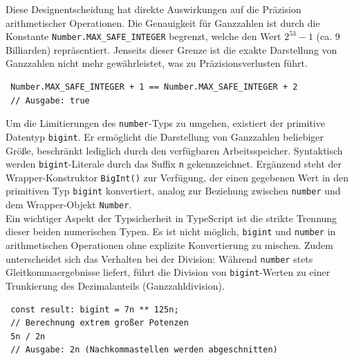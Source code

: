 Diese Designentscheidung hat direkte Auswirkungen auf die Präzision arithmetischer Operationen. Die Genauigkeit für Ganzzahlen ist durch die Konstante \texttt{Number.MAX\_SAFE\_INTEGER} begrenzt, welche den Wert $2^{53} - 1$ (ca. 9 Billiarden) repräsentiert. Jenseits dieser Grenze ist die exakte Darstellung von Ganzzahlen nicht mehr gewährleistet, was zu Präzisionsverlusten führt.
\begin{verbatim}
 Number.MAX_SAFE_INTEGER + 1 == Number.MAX_SAFE_INTEGER + 2
 // Ausgabe: true
\end{verbatim}

Um die Limitierungen des \texttt{number}-Typs zu umgehen, existiert der primitive Datentyp \texttt{bigint}. Er ermöglicht die Darstellung von Ganzzahlen beliebiger Größe, beschränkt lediglich durch den verfügbaren Arbeitsspeicher. Syntaktisch werden \texttt{bigint}-Literale durch das Suffix \texttt{n} gekennzeichnet. Ergänzend steht der Wrapper-Konstruktor \texttt{BigInt()} zur Verfügung, der einen gegebenen Wert in den primitiven Typ \texttt{bigint} konvertiert, analog zur Beziehung zwischen \texttt{number} und dem Wrapper-Objekt \texttt{Number}.\\
Ein wichtiger Aspekt der Typsicherheit in TypeScript ist die strikte Trennung dieser beiden numerischen Typen. Es ist nicht möglich, \texttt{bigint} und \texttt{number} in arithmetischen Operationen ohne explizite Konvertierung zu mischen. Zudem unterscheidet sich das Verhalten bei der Division: Während \texttt{number} stets Gleitkommaergebnisse liefert, führt die Division von \texttt{bigint}-Werten zu einer Trunkierung des Dezimalanteils (Ganzzahldivision).
\begin{verbatim}
 const result: bigint = 7n ** 125n; 
 // Berechnung extrem großer Potenzen
 5n / 2n 
 // Ausgabe: 2n (Nachkommastellen werden abgeschnitten)
\end{verbatim}

